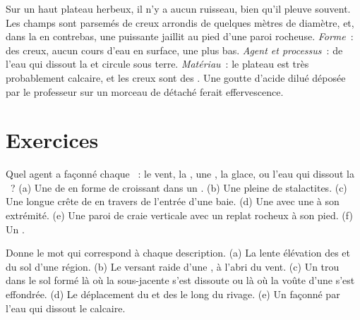 \begin{example}
Sur un haut plateau herbeux, il n'y a aucun ruisseau, bien qu'il pleuve
souvent. Les champs sont parsemés de creux arrondis de quelques mètres de
diamètre, et, dans la  en contrebas, une puissante  jaillit au
pied d'une paroi rocheuse. \emph{Forme}~: des creux, aucun cours d'eau en
surface, une  plus bas. \emph{Agent et processus}~: de l'eau qui
dissout la  et circule sous terre. \emph{Matériau}~: le plateau est
très probablement calcaire, et les creux sont des . Une goutte
d'acide dilué déposée par le professeur sur un morceau de  détaché
ferait effervescence.
\end{example}

\section{Exercices}

\begin{exercise}[$\star$]\label{exo:g9:landforms:1}
Quel agent a façonné chaque ~: le vent, la , une
, la glace, ou l'eau qui dissout la ~? (a) Une  de
 en forme de croissant dans un . (b) Une  pleine de
stalactites. (c) Une longue crête de  en travers de l'entrée d'une
baie. (d) Une  avec une  à son extrémité. (e) Une paroi
de craie verticale avec un replat rocheux à son pied. (f) Un .
\end{exercise}

\begin{exercise}[$\star$]\label{exo:g9:landforms:2}
Donne le mot qui correspond à chaque description. (a) La lente élévation
des  et du sol d'une région. (b) Le versant raide d'une , à
l'abri du vent. (c) Un trou dans le sol formé là où la  sous-jacente
s'est dissoute ou là où la voûte d'une  s'est effondrée. (d) Le
déplacement du  et des  le long du rivage. (e) Un 
façonné par l'eau qui dissout le calcaire.
\end{exercise}

